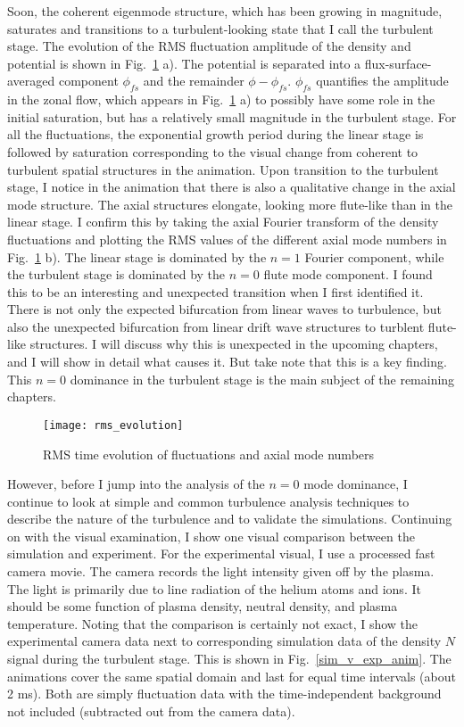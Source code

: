 Soon, the coherent eigenmode structure, which has been growing in magnitude, saturates and transitions to a turbulent-looking state that I call the turbulent stage.
The evolution of the RMS fluctuation amplitude of the density and potential is shown in Fig.~\ref{rms_evolution} a). The potential is separated into a flux-surface-averaged component $\phi_{fs}$
and the remainder $\phi-\phi_{fs}$. $\phi_{fs}$ quantifies the amplitude in the zonal flow, which appears in Fig.~\ref{rms_evolution} a) to possibly have some role in the initial saturation, but
has a relatively small magnitude in the turbulent stage.
For all the fluctuations, the exponential growth period during the linear stage is followed by saturation corresponding to the
visual change from coherent to turbulent spatial structures in the animation. 
Upon transition to the turbulent stage, I notice in the animation that there is also a qualitative change in the axial
mode structure. The axial structures elongate, looking more flute-like than in the linear stage. I confirm this by taking the axial Fourier transform of the density fluctuations and plotting
the RMS values of the different axial mode numbers in Fig.~\ref{rms_evolution} b). The linear stage is dominated by the $n=1$ Fourier component, while the turbulent stage is dominated
by the $n=0$ flute mode component. I found this to be an interesting and unexpected transition when I first identified it. There is not only the expected bifurcation from linear waves to turbulence,
but also the unexpected bifurcation from linear drift wave structures to turblent flute-like structures. I will discuss why this is unexpected in the upcoming chapters, and I will show in detail
what causes it. But take note that this is a key finding. This $n=0$ dominance in the turbulent stage is the main subject of the remaining chapters.


\begin{figure}[!ht]
\centerline{\texttt{[image: rms\_evolution]}}
\caption{RMS time evolution of fluctuations and axial mode numbers}
\label{rms_evolution}
\end{figure}


However, before I jump into the analysis of the $n=0$ mode dominance, I continue to look at simple and common turbulence analysis techniques to describe the nature of the turbulence
and to validate the simulations.
Continuing on with the visual examination, I show one visual comparison between the simulation and experiment. For the experimental visual, I use a processed
fast camera movie. The camera records the light intensity given off by the plasma. The light is primarily due to line radiation of the helium atoms and ions. It should be some function
of plasma density, neutral density, and plasma temperature. Noting that the comparison is certainly not exact, I show the experimental camera data next to corresponding simulation
data of the density $N$ signal during the turbulent stage. This is shown in Fig.~\ref{sim_v_exp_anim}. 
The animations cover the same spatial domain and last for equal time intervals (about 2 ms). Both are simply fluctuation
data with the time-independent background not included (subtracted out from the camera data). 


